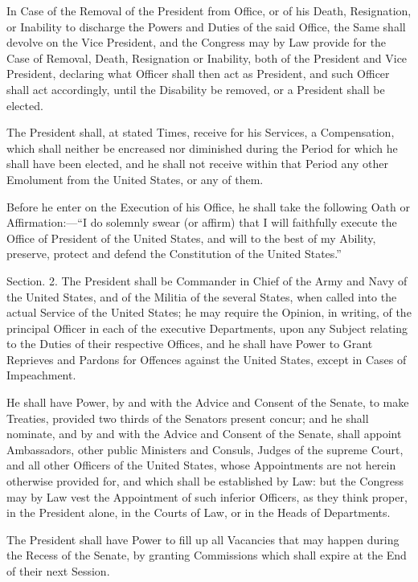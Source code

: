 \documentclass{article}
\begin{document}
In Case of the Removal of the President from Office, or of his Death,
Resignation, or Inability to discharge the Powers and Duties of the said Office,
the Same shall devolve on the Vice President, and the Congress may by Law
provide for the Case of Removal, Death, Resignation or Inability, both of the
President and Vice President, declaring what Officer shall then act as
President, and such Officer shall act accordingly, until the Disability be
removed, or a President shall be elected.

The President shall, at stated Times, receive for his Services, a Compensation,
which shall neither be encreased nor diminished during the Period for which he
shall have been elected, and he shall not receive within that Period any other
Emolument from the United States, or any of them.

Before he enter on the Execution of his Office, he shall take the following Oath
or Affirmation:—“I do solemnly swear (or affirm) that I will faithfully execute
the Office of President of the United States, and will to the best of my
Ability, preserve, protect and defend the Constitution of the United States.”


Section. 2.  The President shall be Commander in Chief of the Army and Navy of
the United States, and of the Militia of the several States, when called into
the actual Service of the United States; he may require the Opinion, in writing,
of the principal Officer in each of the executive Departments, upon any Subject
relating to the Duties of their respective Offices, and he shall have Power to
Grant Reprieves and Pardons for Offences against the United States, except in
Cases of Impeachment.

He shall have Power, by and with the Advice and Consent of the Senate, to make
Treaties, provided two thirds of the Senators present concur; and he shall
nominate, and by and with the Advice and Consent of the Senate, shall appoint
Ambassadors, other public Ministers and Consuls, Judges of the supreme Court,
and all other Officers of the United States, whose Appointments are not herein
otherwise provided for, and which shall be established by Law: but the Congress
may by Law vest the Appointment of such inferior Officers, as they think proper,
in the President alone, in the Courts of Law, or in the Heads of Departments.

The President shall have Power to fill up all Vacancies that may happen during
the Recess of the Senate, by granting Commissions which shall expire at the End
of their next Session.
\end{document}
